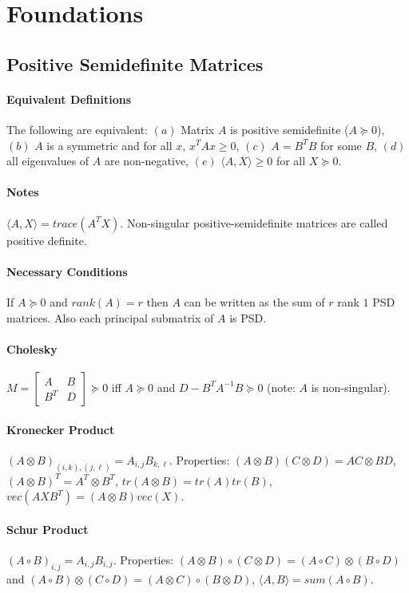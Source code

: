 \documentclass[letterpaper,11pt,oneside,onecolumn]{article}
\begin{document}
\section*{Foundations}
\subsection*{Positive Semidefinite Matrices}
\paragraph{Equivalent Definitions} The following are equivalent: $(a)$ Matrix $A$ is positive semidefinite ($A\succcurlyeq 0$), $(b)$ $A$ is a symmetric and for all $x$, $x^TAx \geq 0$, $(c)$ $A = B^TB$ for some $B$, $(d)$ all eigenvalues of $A$ are non-negative, $(e)$ $\langle A, X\rangle \geq
 0$ for all $X \succcurlyeq 0$.
 \paragraph{Notes} $\langle A, X\rangle = trace(A^TX)$. Non-singular positive-semidefinite matrices are called positive definite.
 \paragraph{Necessary Conditions}
 If $A \succcurlyeq 0$ and $rank(A) = r$ then $A$ can be written as the sum of $r$ rank $1$ PSD matrices. Also each principal submatrix of $A$ is PSD.
 \paragraph{Cholesky} $M = \begin{bmatrix} A & B \\  B^T &D\end{bmatrix} \succcurlyeq 0$ iff $A \succcurlyeq 0$ and $D - B^TA^{-1}B \succcurlyeq 0$ (note: $A$ is non-singular).
\paragraph{Kronecker Product} $(A \otimes B)_{(i,k),(j,\ell)} = A_{i,j}B_{k,\ell}$. Properties: $(A\otimes B)(C\otimes D) = AC \otimes BD$, $(A\otimes B)^T = A^T \otimes B^T$, $tr(A \otimes B)= tr(A) tr(B)$, $vec(AXB^T) = (A\otimes B)vec(X)$.
\paragraph{Schur Product} $(A \circ B)_{i,j} = A_{i,j}B_{i,j}$. Properties: $(A\otimes B) \circ(C\otimes D) = (A\circ C) \otimes (B \circ D)$ and $(A \circ B)\otimes(C\circ D) = (A\otimes C) \circ(B \otimes D)$, $\langle A, B \rangle = sum(A \circ B)$.
\end{document}
